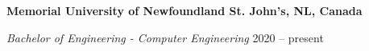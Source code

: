 \textbf{Memorial University of Newfoundland \hfill St. John's, NL, Canada} \par
\textit{Bachelor of Engineering - Computer Engineering} \hfill 2020 -- present\par